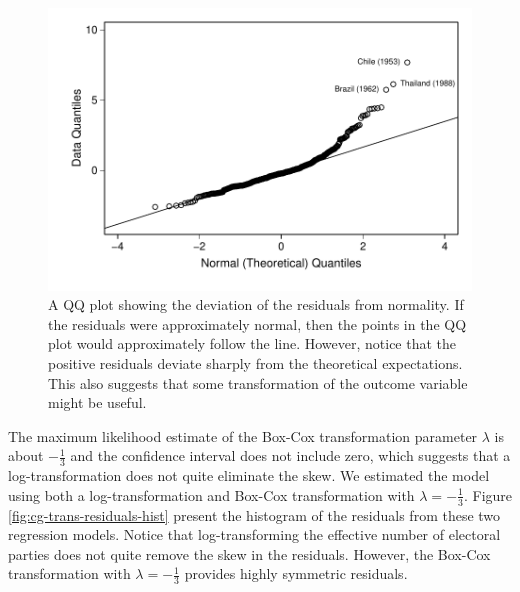 \documentclass[12pt]{article}
\begin{document}
\begin{figure}[h!]
\begin{center}
	\includegraphics[scale = 0.6]{figs/cg-qq-plot.pdf}
\caption{A QQ plot showing the deviation of the residuals from normality. If the residuals were approximately normal, then the points in the QQ plot would approximately follow the line. However, notice that the positive residuals deviate sharply from the theoretical expectations. This also suggests that some transformation of the outcome variable might be useful.}\label{fig:cg-qq-plot}
\end{center}

\end{figure}

The maximum likelihood estimate of the Box-Cox transformation parameter $\lambda$ is about $-\frac{1}{3}$ and the confidence interval does not include zero, which suggests that a log-transformation does not quite eliminate the skew. We estimated the model using both a log-transformation and Box-Cox transformation with $\lambda = -\frac{1}{3}$. Figure \ref{fig:cg-trans-residuals-hist} present the histogram of the residuals from these two regression models. Notice that log-transforming the effective number of electoral parties does not quite remove the skew in the residuals. However, the Box-Cox transformation with $\lambda = -\frac{1}{3}$ provides highly symmetric residuals. 
\end{document}
